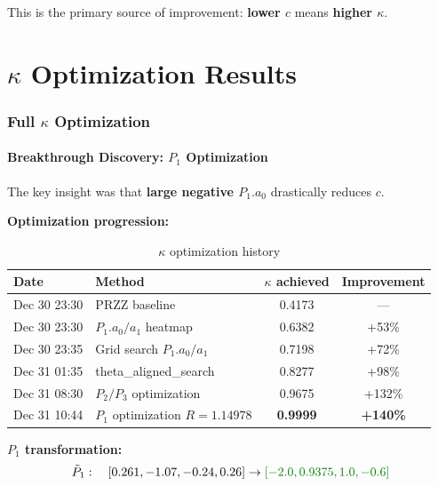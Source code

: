 \documentclass[11pt]{article}
\begin{document}
This is the primary source of improvement: \textbf{lower $c$} means \textbf{higher $\kappa$}.


\part{$\kappa$ Optimization Results}

\section{Full $\kappa$ Optimization}
\label{sec:kappa_opt}

\subsection{Breakthrough Discovery: $P_1$ Optimization}

The key insight was that \textbf{large negative $P_1.a_0$} drastically reduces $c$.

\textbf{Optimization progression:}

\begin{table}[h]
\centering
\caption{$\kappa$ optimization history}
\begin{tabular}{llcc}
\toprule
Date & Method & $\kappa$ achieved & Improvement \\
\midrule
Dec 30 23:30 & PRZZ baseline & 0.4173 & --- \\
Dec 30 23:30 & $P_1.a_0/a_1$ heatmap & 0.6382 & +53\% \\
Dec 30 23:35 & Grid search $P_1.a_0/a_1$ & 0.7198 & +72\% \\
Dec 31 01:35 & theta\_aligned\_search & 0.8277 & +98\% \\
Dec 31 08:30 & $P_2/P_3$ optimization & 0.9675 & +132\% \\
Dec 31 10:44 & $P_1$ optimization $R=1.14978$ & \textbf{0.9999} & \textbf{+140\%} \\
\bottomrule
\end{tabular}
\end{table}

\textbf{$P_1$ transformation:}
\begin{equation}
\tilde{P}_1: \quad [0.261, -1.07, -0.24, 0.26] \to \textcolor{improvement}{[-2.0, 0.9375, 1.0, -0.6]}
\end{equation}
\end{document}
